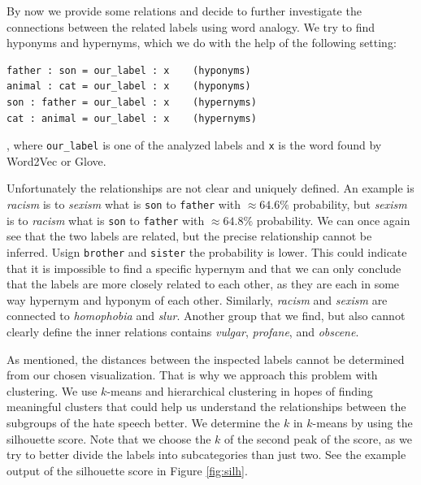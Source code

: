 \documentclass[fleqn,moreauthors,10pt]{ds_report}
\begin{document}
By now we provide some relations and decide to further investigate the connections between the related labels using word analogy. We try to find hyponyms and hypernyms, which we do with the help of the following setting:
\begin{verbatim}
father : son = our_label : x 	(hyponyms)
animal : cat = our_label : x 	(hyponyms)
son : father = our_label : x 	(hypernyms)
cat : animal = our_label : x 	(hypernyms)
\end{verbatim},
where \texttt{our\_label} is one of the analyzed labels and \texttt{x} is the word found by Word2Vec or Glove. 

Unfortunately the relationships are not clear and uniquely defined. An example is \textit{racism} is to \textit{sexism} what is \texttt{son} to \texttt{father} with $\approx 64.6\%$ probability, but \textit{sexism} is to \textit{racism} what is \texttt{son} to \texttt{father} with $\approx 64.8\%$ probability. We can once again see that the two labels are related, but the precise relationship cannot be inferred. Usign \texttt{brother} and \texttt{sister} the probability is lower. This could indicate that it is impossible to find a specific hypernym and that we can only conclude that the labels are more closely related to each other, as they are each in some way hypernym and hyponym of each other. Similarly, \textit{racism} and \textit{sexism} are connected to \textit{homophobia} and \textit{slur}. Another group that we find, but also cannot clearly define the inner relations contains \textit{vulgar}, \textit{profane}, and \textit{obscene}.

As mentioned, the distances between the inspected labels cannot be determined from our chosen visualization. That is why we approach this problem with clustering. We use $k$-means and hierarchical clustering in hopes of finding meaningful clusters that could help us understand the relationships between the subgroups of the hate speech better. We determine the $k$ in $k$-means by using the silhouette score. Note that we choose the $k$ of the second peak of the score, as we try to better divide the labels into subcategories than just two. See the example output of the silhouette score in Figure \ref{fig:silh}.
\end{document}
